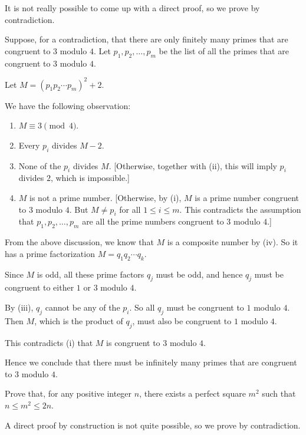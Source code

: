 \begin{idea}
It is not really possible to come up with a direct proof, so we prove by contradiction.
\end{idea}

\begin{solution}
Suppose, for a contradiction, that there are only finitely many primes that are congruent to $3$ modulo $4$. Let $p_1,p_2,\dots,p_m$ be the list of all the primes that are congruent to $3$ modulo $4$.

Let $M=(p_1p_2\cdots p_m)^2+2$.

We have the following observation:
\begin{enumerate}[label=(\roman*)]
\item  $M\equiv 3\pmod 4$.
\item Every $p_i$ divides $M-2$.
\item None of the $p_i$ divides $M$. [Otherwise, together with (ii), this will imply $p_i$ divides $2$, which is impossible.]
\item $M$ is not a prime number. [Otherwise, by (i), $M$ is a prime number congruent to $3$ modulo $4$. But $M\neq p_i$ for all $1\le i\le m$. This contradicts the assumption that $p_1,p_2,\dots,p_m$ are all the prime numbers congruent to $3$ modulo $4$.]
\end{enumerate}

From the above discussion, we know that $M$ is a composite number by (iv). So it has a prime factorization $M=q_1q_2\cdots q_k$.

Since $M$ is odd, all these prime factors $q_j$ must be odd, and hence $q_j$ must be congruent to either $1$ or $3$ modulo $4$.

By (iii), $q_j$ cannot be any of the $p_i$. So all $q_j$ must be congruent to $1$ modulo $4$. Then $M$, which is the product of $q_j$, must also be congruent to $1$ modulo $4$.

This contradicts (i) that $M$ is congruent to $3$ modulo $4$.

Hence we conclude that there must be infinitely many primes that are congruent to $3$ modulo $4$.
\end{solution}

\begin{exercise}
Prove that, for any positive integer $n$, there exists a perfect square $m^2$ such that $n\le m^2\le 2n$.
\end{exercise}

\begin{idea}
A direct proof by construction is not quite possible, so we prove by contradiction.
\end{idea}

